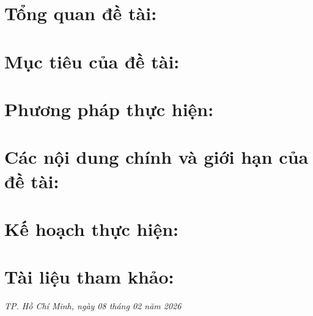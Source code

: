 \documentclass{template/v2}
\begin{document}
\printinfo

\vspace*{3ex}

\section{Tổng quan đề tài:}
\label{sec:tong-quan-de-tai}


\section{Mục tiêu của đề tài:}
\label{sec:muc-tieu-de-tai}


\section{Phương pháp thực hiện:}
\label{sec:phung-phap-thuc-hien}


\section{Các nội dung chính và giới hạn của đề tài:}
\label{sec:noi-dung}


\section{Kế hoạch thực hiện:}
\label{sec:ke-hoach}


\section{Tài liệu tham khảo:}
\justifying\printbibliography[heading=none]

\hfill\textit{TP. Hồ Chí Minh, ngày 08 tháng 02 năm 2026}
\nopagebreak\printsignature
\end{document}
